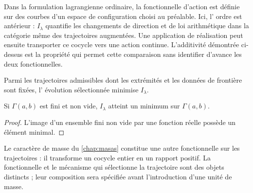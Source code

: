 Dans la formulation lagrangienne ordinaire, la fonctionnelle d'action est définie
sur des courbes d'un espace de configuration choisi au préalable. Ici, l'
ordre est antérieur : \(I_\lambda\) quantifie les changements de direction et de loi
arithmétique dans la catégorie même des trajectoires augmentées. Une application de
réalisation peut ensuite transporter ce cocycle vers une action
continue. L'additivité démontrée ci-dessus est la propriété qui permet cette
comparaison sans identifier d'avance les deux fonctionnelles.

\begin{principle}
Parmi les trajectoires admissibles dont les extrémités et les données de frontière sont fixées, l'
évolution sélectionnée minimise \(I_\lambda\).
\end{principle}

\begin{proposition}
Si \(\Gamma(a,b)\) est fini et non vide, \(I_\lambda\) atteint un minimum sur
\(\Gamma(a,b)\).
\end{proposition}
\begin{proof}
L'image d'un ensemble fini non vide par une fonction réelle possède un
élément minimal.
\end{proof}

Le caractère de masse du \cref{chap:masas} constitue une autre fonctionnelle sur les
trajectoires : il transforme un cocycle entier en un rapport positif. La
fonctionnelle et le mécanisme qui sélectionne la trajectoire sont des objets distincts ;
leur composition sera spécifiée avant l'introduction d'une unité de
masse.
